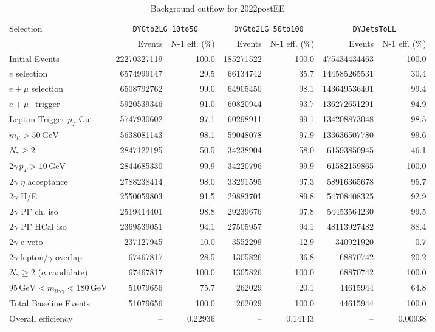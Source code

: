 \begin{table}[htbp]
\centering
\caption{Background cutflow for 2022postEE}
\label{tab:cutflow-bkg-mc-2022postee}
\footnotesize
\begin{tabular}{lrrrrrr}
\hline
Selection & \multicolumn{2}{c}{\texttt{DYGto2LG\_10to50}} & \multicolumn{2}{c}{\texttt{DYGto2LG\_50to100}} & \multicolumn{2}{c}{\texttt{DYJetsToLL}} \\
 & Events & N-1 eff. (\%) & Events & N-1 eff. (\%) & Events & N-1 eff. (\%) \\
\hline
Initial Events & 22270327119 & 100.0 & 185271522 & 100.0 & 475434434463 & 100.0 \\
$e$ selection & 6574999147 & 29.5 & 66134742 & 35.7 & 144585265531 & 30.4 \\
$e+\mu$ selection & 6508792762 & 99.0 & 64905450 & 98.1 & 143649536401 & 99.4 \\
$e+\mu$+trigger & 5920539346 & 91.0 & 60820944 & 93.7 & 136272651291 & 94.9 \\
Lepton Trigger $p_T$ Cut & 5747930602 & 97.1 & 60298911 & 99.1 & 134208873048 & 98.5 \\
$m_{ll} > 50\,\mathrm{GeV}$ & 5638081143 & 98.1 & 59048078 & 97.9 & 133636507780 & 99.6 \\
$N_{\gamma}\geq 2$ & 2847122195 & 50.5 & 34238904 & 58.0 & 61593850945 & 46.1 \\
$2\gamma\,p_T > 10\,\mathrm{GeV}$ & 2844685330 & 99.9 & 34220796 & 99.9 & 61582159865 & 100.0 \\
$2\gamma$ $\eta$ acceptance & 2788238414 & 98.0 & 33291595 & 97.3 & 58916365678 & 95.7 \\
$2\gamma$ H/E & 2550059803 & 91.5 & 29883701 & 89.8 & 54708408325 & 92.9 \\
$2\gamma$ PF ch. iso & 2519414401 & 98.8 & 29239676 & 97.8 & 54453564230 & 99.5 \\
$2\gamma$ PF HCal iso & 2369539051 & 94.1 & 27505957 & 94.1 & 48113927482 & 88.4 \\
$2\gamma$ e-veto & 237127945 & 10.0 & 3552299 & 12.9 & 340921920 & 0.7 \\
$2\gamma$ lepton/$\gamma$ overlap & 67467817 & 28.5 & 1305826 & 36.8 & 68870742 & 20.2 \\
$N_{\gamma}\geq 2$ ($a$ candidate) & 67467817 & 100.0 & 1305826 & 100.0 & 68870742 & 100.0 \\
$95\,\mathrm{GeV} < m_{ll\gamma\gamma} < 180\,\mathrm{GeV}$ & 51079656 & 75.7 & 262029 & 20.1 & 44615944 & 64.8 \\
Total Baseline Events & 51079656 & 100.0 & 262029 & 100.0 & 44615944 & 100.0 \\
\hline
Overall efficiency & -- & 0.22936 & -- & 0.14143 & -- & 0.00938 \\
\hline
\end{tabular}
\end{table}

